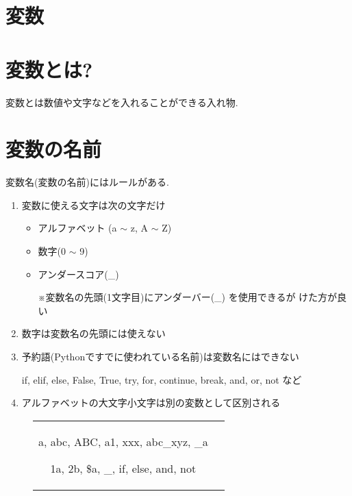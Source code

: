 \documentclass[dvipdfmx]{jsbook}
\newcommand{\countup}[1]{\setcounter{chapter}{#1} \setcounter{section}{0}}
\newcommand{\info}[2]{\begin{tcolorbox}[colframe=gray, colback=black!10!white, coltitle=white, fonttitle=\bfseries, title={#1}]
{#2}\end{tcolorbox}}
\begin{document}


\section*{変数}
\countup{1}
\section{変数とは?}
変数とは数値や文字などを入れることができる入れ物.
\section{変数の名前}
変数名(変数の名前)にはルールがある.
\begin{enumerate}
	\item 変数に使える文字は次の文字だけ
	      \begin{itemize}
		      \item アルファベット (a $\sim$ z, A $\sim$ Z)
		      \item 数字(0 $\sim$ 9)
		      \item アンダースコア(\_) \par
		            ※変数名の先頭(1文字目)にアンダーバー(\_) を使用できるが けた方が良い
	      \end{itemize}
	\item 数字は変数名の先頭には使えない
	\item 予約語(Pythonですでに使われている名前)は変数名にはできない
	      \info{予約語の例}{if, \; elif, \; else, \; False, \; True, \; try, \; for, \; continue, \; break, \; and, \; or, \; not \; など}
	\item アルファベットの大文字小文字は別の変数として区別される
\end{enumerate}

\begin{figure}[htp]
	\begin{tabular}{cc} \hspace{2truemm}
		\begin{minipage}[ht]{.46\textwidth}
			\begin{tcolorbox}[colframe=blue!75!black,
					colback=blue!10!white,
					coltitle=white, fonttitle=\bfseries,
					title=変数名として使える名前の例]
				a, \;abc, \;ABC,\; a1, \; xxx, \; abc\_xyz, \; \_a
			\end{tcolorbox}
		\end{minipage} \hspace{4truemm}
		\begin{minipage}[ht]{.46\textwidth}
			\begin{tcolorbox}[colframe=red!75!black,
					colback=red!10!white,
					coltitle=white, fonttitle=\bfseries,
					title=変数名として使えない名前の例]
				1a, \; 2b, \;  \$a, \; 1\_, \; if, \; else, \; and, \; not
			\end{tcolorbox}
		\end{minipage}
	\end{tabular}
\end{figure}
\end{document}
